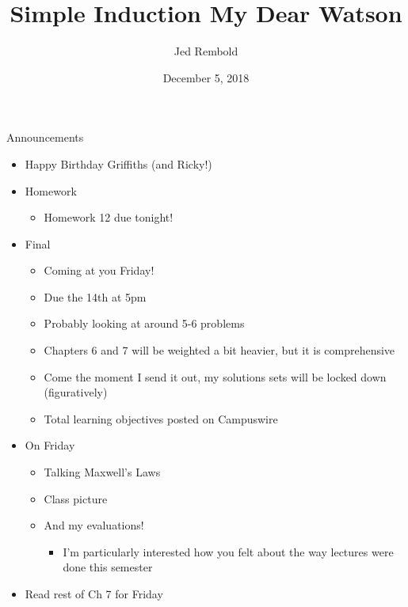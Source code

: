 \documentclass[pdf,aspectratio=169]{beamer}
\title{Simple Induction My Dear Watson}
\date{December 5, 2018}
\author{Jed Rembold}
\begin{document}
\renewcommand{\theenumi}{\Alph{enumi}}

\begin{frame}{Announcements}
	\begin{itemize}
		\item Happy Birthday Griffiths (and Ricky!)
		\item Homework
			\begin{itemize}
				\item Homework 12 due tonight!
			\end{itemize}
		\item Final
			\begin{itemize}
				\item Coming at you Friday!
				\item Due the 14th at 5pm
				\item Probably looking at around 5-6 problems
				\item Chapters 6 and 7 will be weighted a bit heavier, but it is comprehensive
				\item Come the moment I send it out, my solutions sets will be locked down (figuratively)
				\item Total learning objectives posted on Campuswire
			\end{itemize}
		\item On Friday
			\begin{itemize}
				\item Talking Maxwell's Laws
				\item Class picture
				\item And my evaluations!
					\begin{itemize}
						\item I'm particularly interested how you felt about the way lectures were done this semester
					\end{itemize}
			\end{itemize}
		\item Read rest of Ch 7 for Friday
	\end{itemize}
\end{frame}
\end{document}
